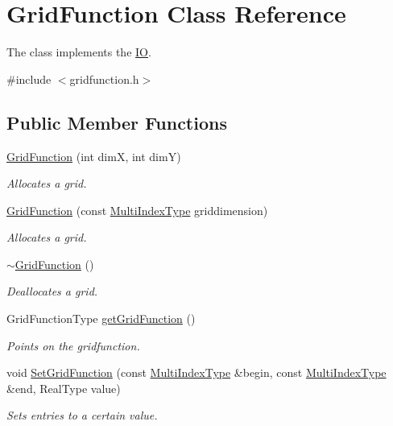 \hypertarget{classGridFunction}{\section{Grid\-Function Class Reference}
\label{classGridFunction}
}


The class implements the \hyperlink{classIO}{I\-O}.  




{\ttfamily \#include $<$gridfunction.\-h$>$}

\subsection*{Public Member Functions}
\begin{DoxyCompactItemize}
\item 
\hyperlink{classGridFunction_a798c74f3481fc35a7ce39e2136fc96c5}{Grid\-Function} (int dim\-X, int dim\-Y)
\begin{DoxyCompactList}\small\item\em Allocates a grid. \end{DoxyCompactList}\item 
\hyperlink{classGridFunction_a7e13b13c332e7278317d927271d8f495}{Grid\-Function} (const \hyperlink{classArray}{Multi\-Index\-Type} griddimension)
\begin{DoxyCompactList}\small\item\em Allocates a grid. \end{DoxyCompactList}\item 
\hyperlink{classGridFunction_abb09063b794d6180c5ef65e1c2e7cc23}{$\sim$\-Grid\-Function} ()
\begin{DoxyCompactList}\small\item\em Deallocates a grid. \end{DoxyCompactList}\item 
Grid\-Function\-Type \hyperlink{classGridFunction_a22f2c9d48993df03e959bbe74569660a}{get\-Grid\-Function} ()
\begin{DoxyCompactList}\small\item\em Points on the gridfunction. \end{DoxyCompactList}\item 
void \hyperlink{classGridFunction_a64fce241fb08877d1b8289fe755c2a2f}{Set\-Grid\-Function} (const \hyperlink{classArray}{Multi\-Index\-Type} \&begin, const \hyperlink{classArray}{Multi\-Index\-Type} \&end, Real\-Type value)
\begin{DoxyCompactList}\small\item\em Sets entries to a certain value. \end{DoxyCompactList}\item 

\end{DoxyCompactItemize}
